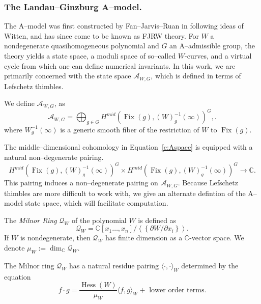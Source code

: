 \documentclass[10pt, letterpaper]{amsart}
\theoremstyle{remark}
\newcommand{\CC}{\mathbb C}
\newcommand{\sA}{\mathscr{A}}
\newcommand{\sQ}{\mathscr{Q}}
\newcommand{\defital}{\textit}
\DeclareMathOperator{\Hess}{Hess}
\DeclareMathOperator{\Fix}{Fix}
\begin{document}
\subsubsection*{The Landau--Ginzburg A--model.} The A--model was first constructed by Fan--Jarvis--Ruan in \cite{FJR13} following ideas of Witten, and has since come to be known as FJRW theory. For $W$ a nondegenerate quasihomogeneous polynomial and $G$ an A--admissible group, the theory yields a state space, a moduli space of so--called $W$-curves, and a virtual cycle from which one can define numerical invariants. In this work, we are primarily concerned with the state space $\sA_{W,G}$, which is defined in terms of Lefschetz thimbles.

We define $\sA_{W,G}$, as %
\begin{equation}\label{e:Aspace}
\sA_{W,G} = \bigoplus_{g \in G} H^{mid} (\Fix(g),(W)_g^{-1}( \infty))^G,.
\end{equation}
where $W_g^{-1}(\infty)$ is a generic smooth fiber of the restriction of $W$ to $\Fix(g)$.

The middle--dimensional cohomology in Equation~\ref{e:Aspace} is equipped with a natural non--degenerate pairing.
\[
H^{mid} (\Fix(g),(W)_g^{-1}( \infty))^G \times H^{mid} (\Fix(g),(W)_g^{-1}( \infty))^G\to \CC. 
\]
This pairing induces a non--degenerate pairing on $\sA_{W,G}$. Because Lefschetz thimbles are more difficult to work with, we give an alternate defintion of the A--model state space, which will facilitate computation. 

The \defital{Milnor Ring} $\sQ_W$ of the polynomial $W$ is defined as 
\[
\sQ_W =\CC[x_1 \ldots, x_n]/
\left\langle\left\{\partial W/\partial x_i\right\}\right\rangle.
\]
If $W$ is nondegenerate, then $\sQ_W$ has finite dimension as a $\CC$-vector space. We denote $\mu_W:=\dim_\CC \sQ_W$. 

The Milnor ring $\sQ_W$ has a natural residue pairing $\langle \cdot , \cdot\rangle_W$ determined by the equation 
 \begin{equation}\label{e:milpairing}
f\cdot g =  \frac{\Hess(W)}{\mu_W}\langle f, g\rangle_W+ \text{ lower order terms}.%
 \end{equation}
\end{document}
